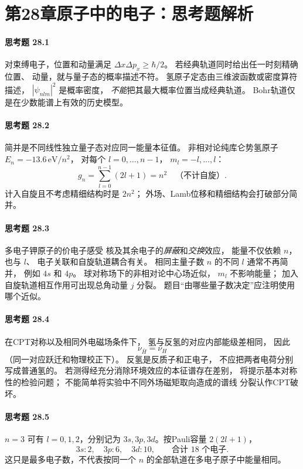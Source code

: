 \section*{第28章\quad 原子中的电子：思考题解析}
\paragraph{思考题 28.1}
对束缚电子，位置和动量满足
\(\Delta x\Delta p_x\ge\hbar/2\)。
若经典轨道同时给出任一时刻精确位置、
动量，就与量子态的概率描述不符。
氢原子定态由三维波函数或密度算符描述，
\(|\psi_{nlm}|^2\) 是概率密度，
\emph{不能}把其最大概率位置当成经典轨道。
Bohr轨道仅是在少数能谱上有效的历史模型。

\paragraph{思考题 28.2}
简并是不同线性独立量子态对应同一能量本征值。
非相对论纯库仑势氢原子
\(E_n=-13.6\,\mathrm{eV}/n^2\)，
对每个 \(l=0,\ldots,n-1\)，
\(m_l=-l,\ldots,l\)：
\[
\boxed{g_n=\sum_{l=0}^{n-1}(2l+1)=n^2
\quad\text{（不计自旋）}}.
\]
计入自旋且不考虑精细结构时是 \(2n^2\)；
外场、Lamb位移和精细结构会打破部分简并。

\paragraph{思考题 28.3}
多电子钾原子的价电子感受
核及其余电子的\emph{屏蔽}和\emph{交换}效应，
能量不仅依赖 \(n\)，也与 \(l\)、
电子关联和自旋轨道耦合有关。
相同主量子数 \(n\) 的不同 \(l\) 通常不再简并，
例如 \(4s\) 和 \(4p\)。
球对称场下的非相对论中心场近似，
\(m_l\) 不影响能量；
加入自旋轨道相互作用可出现总角动量 \(j\) 分裂。
题目“由哪些量子数决定”应注明使用哪个近似。

\paragraph{思考题 28.4}
在CPT对称以及相同外电磁场条件下，
氢与反氢的对应内部能级差相同，
因此
\[
\boxed{\nu_{\bar H}=\nu_H}
\]
（同一对应跃迁和物理校正下）。
反氢是反质子和正电子，
不应把两者电荷分别写成普通氢的。
若测得经充分消除环境效应的本征谱存在差别，
将提示基本对称性的检验问题；
不能简单将实验中不同外场磁矩取向造成的谱线
分裂认作CPT破坏。

\paragraph{思考题 28.5}
\(n=3\) 可有
\(l=0,1,2\)，分别记为
\(3s,3p,3d\)。按Pauli容量
\(2(2l+1)\)，
\[
\boxed{3s:2,\quad 3p:6,\quad 3d:10},
\qquad
\boxed{\text{合计 }18\text{ 个电子}}.
\]
这只是最多电子数，不代表按同一个 \(n\)
的全部轨道在多电子原子中能量相同。


